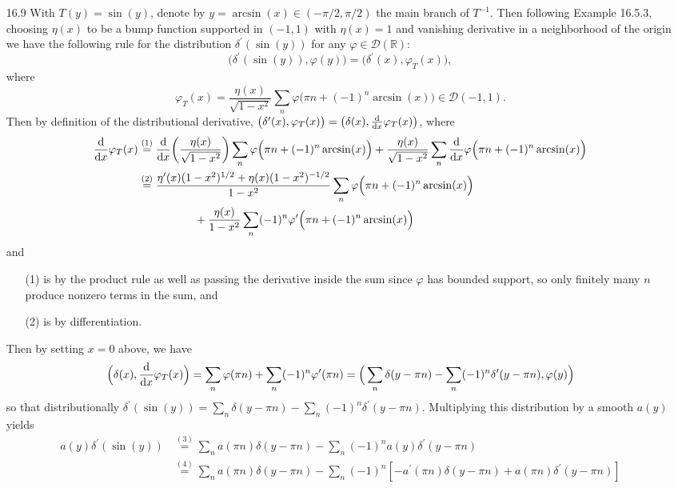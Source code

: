 \documentclass[11pt]{article}
\newcommand{\eq}[1]{\overset{(#1)}{=}}
\begin{document}
\begin{enumerate}
    \item[16.9] With $T(y) = \sin(y)$, denote by $y = \arcsin(x)\in (-\pi/2,\pi/2)$ the main branch of $T^{-1}$. Then following Example 16.5.3, choosing $\eta(x)$ to be a bump function supported in $(-1,1)$ with $\eta(x)=1$ and vanishing derivative in a neighborhood of the origin we have the following rule for the distribution $\delta^\prime(\sin(y))$ for any $\varphi\in\mathcal{D}(\mathbb{R})$: 
    \[\Big(\delta^\prime(\sin(y)),\varphi(y)\Big) = \Big(\delta^\prime(x),\varphi_T(x)\Big),\] where \[\varphi_T(x) = \frac{\eta(x)}{\sqrt{1-x^2}}\sum_n\varphi\Big(\pi n + (-1)^n\arcsin(x)\Big)\in\mathcal{D}(-1,1).\]
    Then by definition of the distributional derivative, $\big(\delta^\prime(x),\varphi_T(x)\big) = \big(\delta(x),\dv x \varphi_T(x)\big)$, where
    \begin{align*}
        \dv x \varphi_T(x) &\eq{1} \dv{x}\bigg(\frac{\eta(x)}{\sqrt{1-x^2}}\bigg)\sum_n\varphi\Big(\pi n + (-1)^n\arcsin(x)\Big) + \frac{\eta(x)}{\sqrt{1-x^2}}\sum_n\dv{x}\varphi\Big(\pi n + (-1)^n\arcsin(x)\Big)\\
        &\eq{2} \frac{\eta^\prime(x)(1-x^2)^{1/2}+\eta(x)(1-x^2)^{-1/2}}{1-x^2}\sum_n\varphi\Big(\pi n + (-1)^n\arcsin(x)\Big)\\
        &\hspace{5em}+\frac{\eta(x)}{1-x^2}\sum_n(-1)^n\varphi^\prime\Big(\pi n + (-1)^n\arcsin(x)\Big)
    \end{align*} and \begin{enumerate}
        \item[(1)] is by the product rule as well as passing the derivative inside the sum since $\varphi$ has bounded support, so only finitely many $n$ produce nonzero terms in the sum, and
        \item[(2)] is by differentiation. 
    \end{enumerate}
    Then by setting $x = 0$ above, we have \[\Big(\delta(x),\dv x \varphi_T(x)\Big) = \sum_n\varphi(\pi n) + \sum_n(-1)^n\varphi^\prime(\pi n) = \Big(\sum_n\delta(y-\pi n) - \sum_n(-1)^n\delta^\prime(y-\pi n),\varphi(y)\Big)\] so that distributionally $\delta^\prime(\sin(y)) = \sum_n\delta(y-\pi n) - \sum_n(-1)^n\delta^\prime(y-\pi n)$. Multiplying this distribution by a smooth $a(y)$ yields \begin{align*}
        a(y)\delta^\prime(\sin(y)) &\eq{3} \sum_n a(\pi n)\delta(y-\pi n) - \sum_n(-1)^na(y)\delta^\prime(y-\pi n)\\
        &\eq{4} \sum_n a(\pi n)\delta(y-\pi n) - \sum_n (-1)^n[-a^\prime(\pi n)\delta(y-\pi n) + a(\pi n)\delta^\prime(y-\pi n)]\\

\end{align*}
\end{enumerate}
\end{document}
